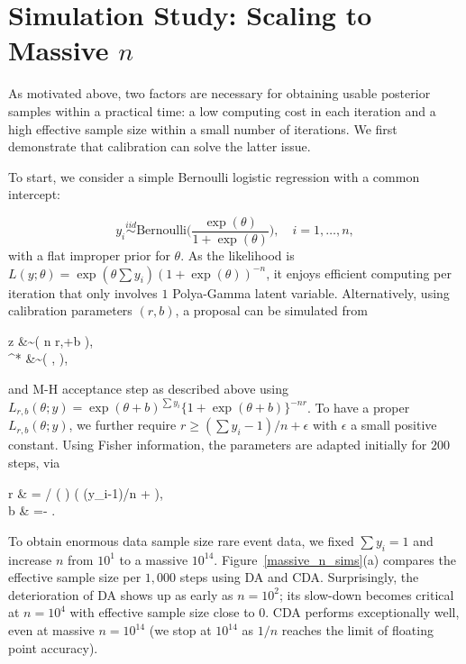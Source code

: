 \documentclass[12pt]{article}
\newcommand{\be}{\begin{equs}}
\newcommand{\ee}{\end{equs}}
\newcommand{\No}{\text{No}}
\newcommand{\PG}{\text{PG}}
\newcommand{\Bern}{\text{Bernoulli}}
\begin{document}
{
\section{Simulation Study: Scaling to Massive $n$}
}

As motivated above,  two factors are necessary for obtaining usable posterior samples within a practical  time: a low computing cost  in each iteration and a high effective sample size within a small number of iterations. We first demonstrate that calibration can solve the latter issue.

To start, we consider a simple Bernoulli logistic regression with a common intercept:

$$y_i\stackrel{iid}{\sim} \Bern\Big(\frac{\exp(\theta)}{1+\exp(\theta)}\Big), \quad i=1,\ldots,n,$$
with a flat improper prior for $\theta$. As the likelihood is \\ $L(y;\theta )= {\exp(\theta\sum y_i)}{(1+\exp(\theta))^{-n}} $, it enjoys efficient computing per iteration
that only involves $1$  Polya-Gamma latent variable. Alternatively, using calibration parameters $(r,b)$, a  proposal can be simulated from
\be
z &\sim \PG\left ( n r,\theta+b \right),\\
\theta^* &\sim \No \left( , \right),
\ee
and M-H acceptance step as described above using \\ $L_{r,b}(\theta; y) = {\exp(\theta+b)^{\sum y_i}}{\{ 1+\exp(\theta+b)\}^{-nr}}$.
To have a proper $L_{r,b}(\theta;y)$, we further require $r \ge (\sum y_i-1)/n + \epsilon$ with $\epsilon$ a small positive constant. 
 Using Fisher information, the  parameters are adapted initially for $200$
 steps, via 
 
\be
 r & = / \left (    \tanh{} \right) \vee \big ( (\sum y_i-1)/n + \epsilon \big), \\
b & = - \theta.
\ee

{To obtain enormous data sample size rare event data}, we fixed $\sum
y_i=1$ and increase $n$ from $10^1$ to a massive $10^{14}$. 
Figure~\ref{massive_n_sims}(a) compares the effective sample size per $1,000$
steps using DA and CDA. Surprisingly, the deterioration of DA shows up as early
as $n=10^2$; its slow-down becomes critical at $n=10^4$ with
effective sample size close to $0$. CDA performs exceptionally well, even
at massive $n=10^{14}$ (we stop at $10^{14}$ as $1/n$ reaches the limit of floating
point accuracy).
\end{document}
